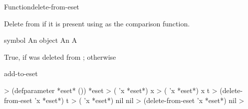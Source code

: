 \documentclass[10pt,twoside,english,pdftex]{article}
\begin{document}

\begin{functiondoc}{Function}{delete-from-eset}{
    }
  
\fnsyntax

\fnpurpose Delete  from  if it is present
using  as the comparison function.

\fnpackage {}

\fnmodule {}

\fnargs
\begin{args}{symbol}
\arg[item] An object
\arg[eset] An 
\arg[deleted-p] A 
\end{args}

\fnreturns True, if  was deleted from ; \nil{} otherwise

\begin{alsos}{add-to-eset}
\also[in-eset]
\end{alsos}

\fnexamples
{}%
%
%
%
\W\supp
\begin{example}
  > (defparameter *eset* ())
  *eset
  > ( 'x *eset*)
  x
  > ( 'x *eset*)
  x
  t\goodpagebreak
  > (delete-from-eset 'x *eset*)
  t
  > ( 'x *eset*)
  nil
  nil
  > (delete-from-eset 'x *eset*)
  nil
  > 
\end{example}

\end{functiondoc}

\end{document}
